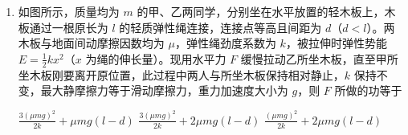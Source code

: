 \documentclass[\gkver]{gaokaozhenti}
\begin{document}
\begin{enumerate}
{即内能增大，$\Delta U_{ab} > 0$，根据热力学第一定律 $\Delta U = Q + W$ 可知 $a \to b$ 过程，气体从外界吸收的热量一部分用于对外做功，另一部分用于增加内能，A 错误；

B．方法一：$b \to c$ 过程中气体与外界无热量交换，即 $Q_{bc} = 0$

又由气体体积增大可知 $W_{bc} < 0$，由热力学第一定律 $\Delta U = Q + W$ 可知气体内能减少。

方法二：$c \to a$ 过程为等温过程，所以 $T_{c} = T_{a}$。

结合 $T_{b} > T_{a}$ 分析可知 $T_{b} > T_{c}$。

所以 $b$ 到 $c$ 过程气体的内能减少。故 B 错误；

C．$c \to a$ 过程为等温过程，可知 $T_{c} = T_{a}$，$\Delta U_{ac} = 0$。

根据热力学第一定律可知 $a \to b \to c$ 过程，气体从外界吸收的热量全部用于对外做功，C 正确；

D．根据热力学第一定律结合上述解析可知：$a \to b \to c \to a$ 一整个热力学循环过程 $\Delta U = 0$，整个过程气体对外做功，因此热力学第一定律可得

$\Delta U = Q_{ab} - Q_{ca} - W = 0$

故 $a \to b$ 过程气体从外界吸收的热量 $Q_{ab}$ 不等于 $c \to a$ 过程放出的热量 $- Q_{ca}$，D 错误。

故选 C。
}

\item
如图所示，质量均为 $m$ 的甲、乙两同学，分别坐在水平放置的轻木板上，木板通过一根原长为 $l$ 的轻质弹性绳连接，连接点等高且间距为 $d$（$d < l$）。两木板与地面间动摩擦因数均为 $\mu$，弹性绳劲度系数为 $k$，被拉伸时弹性势能 $E = \frac{1}{2}kx^{2}$（$x$ 为绳的伸长量）。现用水平力 $F$ 缓慢拉动乙所坐木板，直至甲所坐木板刚要离开原位置，此过程中两人与所坐木板保持相对静止，$k$ 保持不变，最大静摩擦力等于滑动摩擦力，重力加速度大小为 $g$，则 $F$ 所做的功等于


{$\frac{3(\mu mg)^{2}}{2k} + \mu mg(l - d)$}
{$\frac{3(\mu mg)^{2}}{2k} + 2\mu mg(l - d)$}
{$\frac{(\mu mg)^{2}}{2k} + 2\mu mg(l - d)$}

\end{enumerate}
\end{document}
